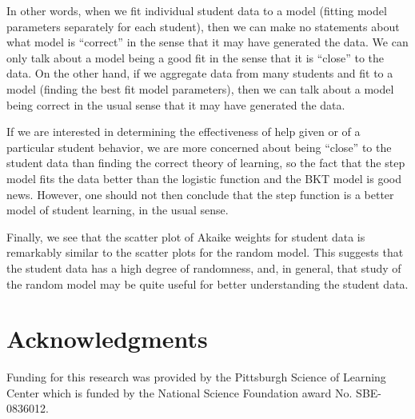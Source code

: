 \documentclass{edm_template}
\begin{document}
In other words, when we fit individual student data to a model (fitting
model parameters separately for each student), then we can make no
statements about what model is ``correct'' in the sense that it may
have generated the data.  We can only talk about a model being a good
fit in the sense that it is ``close'' to the data.
On the other hand, if we aggregate data from many students and fit to a
model (finding the best fit model parameters), then we can talk about
a model being correct in the usual sense  that it may have generated
the data.  

If we are interested in determining the effectiveness
of help given or of a particular student behavior,
we are more concerned about being ``close'' to
the student data than finding the correct theory of learning, so the
fact that the step model fits the data better than the logistic function and
the BKT model is good news.  However, one should not then conclude
that the step function is a better model of student learning,
in the usual sense.

Finally, we see that the scatter plot of Akaike weights for student
data is remarkably similar to the scatter plots for the random model.
This suggests that the student data has a high degree of randomness,
and, in general, that study of the random model may be quite useful for better
understanding the student data.

\section{Acknowledgments}
Funding for this research was provided by the Pittsburgh Science of
Learning Center which is funded by the National Science Foundation
award No. SBE-0836012.

%


\end{document}
